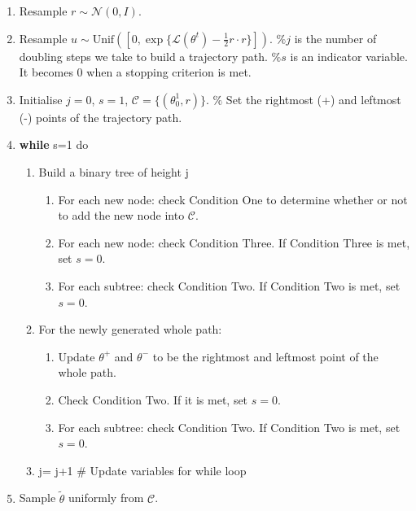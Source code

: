 \documentclass{article}
\begin{document}
\begin{enumerate}
\item Resample $r\sim\mathcal{N}(0,I)$.
\item Resample $u\sim\text{Unif}([0,\exp\{\mathcal{L}(\theta^t)-\frac{1}{2}r\cdot r\}])$.
$\%j$ is the number of doubling steps we take to build a trajectory path.
$\%s$ is an indicator variable. It becomes 0 when a stopping criterion is met.
\item Initialise $j=0$, $s=1$, $\mathcal{C}=\{(\theta_0^1,r)\}$. $\%$ Set the rightmost (+) and leftmost (-) points of the trajectory path.
\item \textbf{while} s=1 do
\begin{enumerate}
\item Build a binary tree of height j
\begin{enumerate}
\item For each new node: check Condition One to determine whether or not to add the new node into $\mathcal{C}$.
\item For each new node: check Condition Three. If Condition Three is met, set $s=0$.
\item For each subtree: check Condition Two. If Condition Two is met, set $s=0$.
\end{enumerate}
\item For the newly generated whole path:
\begin{enumerate}
\item Update $\theta^{+}$ and $\theta^{-}$ to be the rightmost and leftmost point of the whole path.
\item Check Condition Two. If it is met, set $s=0$.
\item For each subtree: check Condition Two. If Condition Two is met, set $s=0$.
\end{enumerate}
\item  j= j+1 $\#$ Update variables for while loop
\end{enumerate}
\item Sample $\tilde{\theta}$ uniformly from $\mathcal{C}$.
\end{enumerate}
\end{document}
